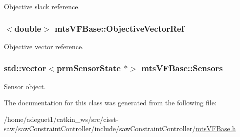 Objective slack reference. 

\hypertarget{classmts_v_f_base_a3eb71862ba4f3e84334626da145500b8}{
\subsubsection[{Objective\-Vector\-Ref}]{$<$double$>$ mts\-V\-F\-Base\-::\-Objective\-Vector\-Ref}}\label{classmts_v_f_base_a3eb71862ba4f3e84334626da145500b8}


Objective vector reference. 

\hypertarget{classmts_v_f_base_aaa45dda5c29d0b4b4b097988fea04ed5}{
\subsubsection[{Sensors}]{\setlength{\rightskip}{0pt plus 5cm}std\-::vector$<$prm\-Sensor\-State $\ast$$>$ mts\-V\-F\-Base\-::\-Sensors}}\label{classmts_v_f_base_aaa45dda5c29d0b4b4b097988fea04ed5}


Sensor object. 



The documentation for this class was generated from the following file\-:\begin{DoxyCompactItemize}
\item 
/home/adeguet1/catkin\-\_\-ws/src/cisst-\/saw/saw\-Constraint\-Controller/include/saw\-Constraint\-Controller/\hyperlink{mts_v_f_base_8h}{mts\-V\-F\-Base.\-h}\end{DoxyCompactItemize}

